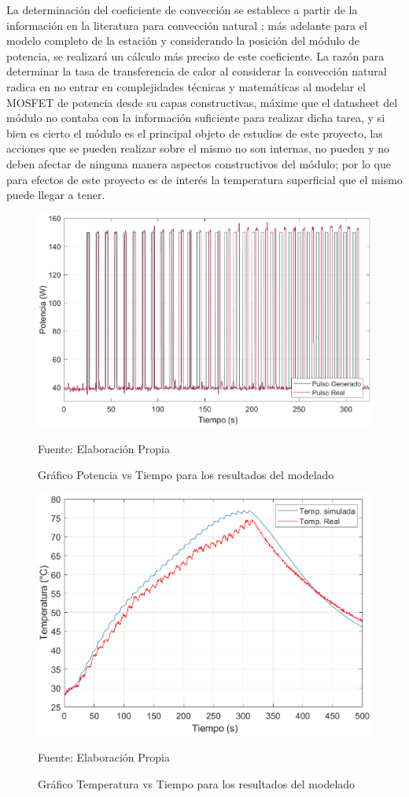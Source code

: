La determinación del coeficiente de convección se establece a partir de la información en la literatura para convección natural \cite{redfrio}; más adelante para el modelo completo de la estación y considerando la posición del módulo de potencia, se realizará un cálculo más preciso de este coeficiente. La razón para determinar la tasa de transferencia de calor al considerar la convección natural radica en no entrar en complejidades técnicas y matemáticas al modelar el MOSFET de potencia desde su capas constructivas, máxime que el datasheet del módulo no contaba con la información suficiente para realizar dicha tarea, y si bien es cierto el módulo es el principal objeto de estudios de este proyecto, las acciones que se pueden realizar sobre el mismo no son internas, no pueden y no deben afectar de ninguna manera aspectos constructivos del módulo; por lo que para efectos de este proyecto es de interés la temperatura superficial que el mismo puede llegar a tener.

\begin{figure}[H]
\centering
\includegraphics[scale=0.63]{Figuras/Resultado_P.eps}
\caption{Gráfico Potencia vs Tiempo para los resultados del modelado}
Fuente: Elaboración Propia
\label{resultado_P}
\end{figure}

\begin{figure}[H]
\centering
\includegraphics[scale=0.66]{Figuras/Resultado_T.eps}
\caption{Gráfico Temperatura vs Tiempo para los resultados del modelado}
Fuente: Elaboración Propia
\label{resultado_T}
\end{figure}

